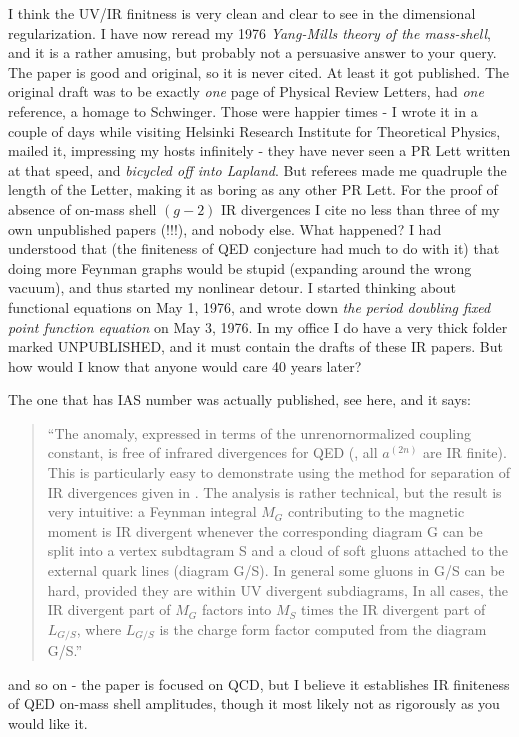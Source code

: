 \begin{description}
I think the UV/IR finitness is very clean and clear to see in the
dimensional regularization.
I have now reread my 1976 {\em {Yang-Mills} theory of the
mass-shell}, and it is a rather amusing, but probably not a
persuasive answer to your query. The paper is good and original, so it is
never cited. At least it got published. The original draft was to be
exactly \emph{one} page of Physical Review Letters, {had} \emph{one}
reference, a homage to Schwinger. Those were happier
times - I wrote it in a couple of days while visiting Helsinki Research
Institute for Theoretical Physics, mailed it, impressing my hosts
infinitely - they have never seen a PR Lett written at that speed, and
{\em bicycled off into Lapland}. But referees made me quadruple the
length of the Letter, making it as boring as any other PR Lett. For the
proof of absence of on-mass shell $(g-2)$ IR divergences I cite no less
than three of my own unpublished papers (!!!), and nobody else.
What
happened? I had understood that (the finiteness of QED
conjecture had much to do with it) that doing more Feynman graphs would
be stupid (expanding around the wrong vacuum), and thus started my
nonlinear detour. I started thinking about functional equations on May 1,
1976, and wrote down
{\em the period doubling fixed point function equation} on May 3, 1976.
In my office I do have a very thick folder marked UNPUBLISHED, and it
must contain the drafts of these IR papers. But how would I know that
anyone would care 40 years later?

The one that has IAS number was actually published, see
{here}, and it says:
\begin{quote}
``The anomaly, expressed in terms of the unrenornormalized coupling
constant, is free of infrared divergences for QED (\ie, all $a^{(2n)}$
are IR finite). This is particularly easy to demonstrate using the method
for separation of IR divergences given in . The
analysis is rather technical, but the result is very intuitive: a Feynman
integral $M_G$ contributing to the magnetic moment is IR divergent
whenever the corresponding diagram G can be split into a vertex
subdtagram S and a cloud of soft gluons attached to the external quark
lines (diagram G/S). In general some gluons in G/S can be hard, provided
they are within UV divergent subdiagrams, In all cases, the IR divergent
part of $M_G$ factors into $M_S$ times the IR divergent part of
$L_{G/S}$, where $L_{G/S}$ is the charge form factor computed from the
diagram G/S.''
\end{quote}
and so on - the paper is focused on QCD, but I believe it establishes IR
finiteness of QED on-mass shell amplitudes, though it most likely not as
rigorously as you would like it.


\end{description}

